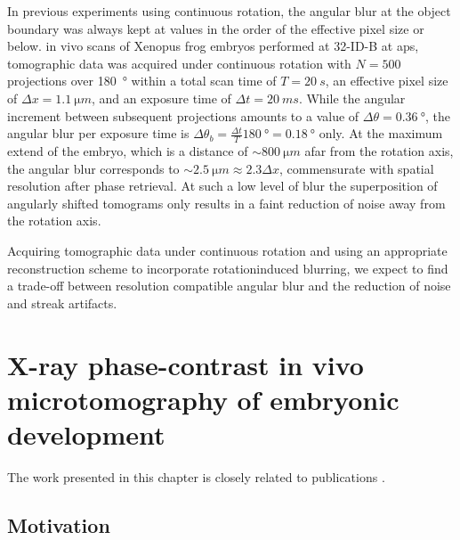 \documentclass[
twoside,
openright,
titlepage,
numbers=noenddot,
headinclude,
fleqn,
a4paper,
footinclude=true,
cleardoublepage=empty,
abstractoff,
BCOR=5mm,
paper=a4,
fontsize=11pt,
british,ngerman,american,
]{scrreprt}
\begin{document}
In previous experiments using continuous rotation, the angular blur at
the object boundary was always kept at values in the order of the
effective pixel size or below.  \Eg{} in vivo scans of Xenopus frog
embryos performed at 32-ID-B at \ac{aps}, tomographic data was
acquired under continuous rotation with $N=\num{500}$ projections over
\SI{180}{\degree} within a total scan time of $T=\SI{20}{s}$, an
effective pixel size of $\Delta x=\SI{1.1}{\micro m}$, and an exposure
time of $\Delta t=\SI{20}{ms}$.  While the angular increment between
subsequent projections amounts to a value of $\Delta
\theta=\SI{0.36}{\degree}$, the angular blur per exposure time is
$\Delta \theta_b=\frac{\Delta
  t}{T}\SI{180}{\degree}=\SI{0.18}{\degree}$ only.  At the maximum
extend of the embryo, which is a distance of $\sim\SI{800}{\micro m}$
afar from the rotation axis, the angular blur corresponds to $\sim
\SI{2.5}{\micro m}\approx \num{2.3} \Delta x$, commensurate with
spatial resolution after phase retrieval.  At such a low level of blur
the superposition of angularly shifted tomograms only results in a
faint reduction of noise away from the rotation axis.

Acquiring tomographic data under continuous rotation and using an
appropriate reconstruction scheme to incorporate rotation\hyph induced
blurring, we expect to find a trade-off between resolution\hyph
compatible angular blur and the reduction of noise and streak
artifacts.


\chapter{X-ray phase-contrast in vivo 
microtomography of embryonic development}
\label{cha:bio}


The work presented in this chapter is closely related to publications
\cite{Moosmann2013nature,Moosmann2014natp}.

\section{Motivation}
\label{sec:bio-motivation}
\end{document}
